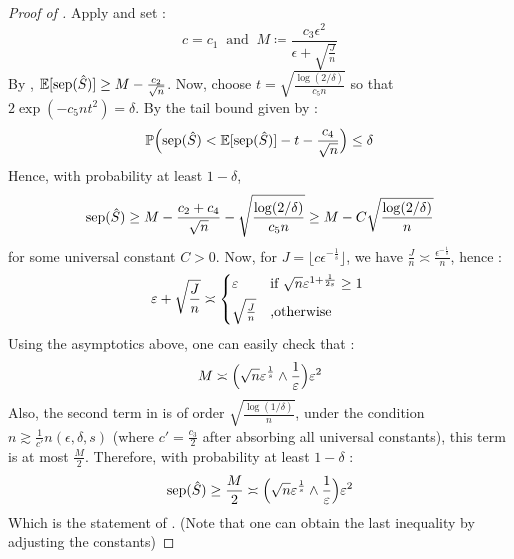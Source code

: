 \begin{proof}[Proof of ]
    Apply  and set : 
    \begin{equation*}
        c = c_1 \ \text{ and } \ M \coloneqq \frac{c_3 \epsilon^2}{\epsilon+ \sqrt{\frac{J}{n}}}
    \end{equation*}
    By , $\E[\sep(\hat{S})] \geq M -\frac{c_2}{\sqrt{n}}$. Now, choose $t = \sqrt{\frac{\log(2/\delta)}{c_5 n}}$ so that $2\exp(-c_5nt^2) = \delta$. By the tail bound given by  : 
    \begin{equation*}
        \P \Bigl(\sep(\hat{S}) <  \E[\sep(\hat{S})]-t-\frac{c_4}{\sqrt{n}}\Bigr) \leq \delta
    \end{equation*}
    Hence, with probability at least $1-\delta$, 
    \begin{equation}\label{ineqsep}
        \sep(\hat{S}) \geq M -\frac{c_2+c_4}{\sqrt{n}}-\sqrt{\frac{\log(2/\delta)}{c_5 n}} \geq M -C\sqrt{\frac{\log(2/\delta)}{n}}
    \end{equation}
    for some universal constant $C>0$. Now, for $J = \lfloor c\epsilon^{-\frac{1}{s}}\rfloor$, we have $\frac{J}{n} \asymp \frac{\epsilon^{-\frac{1}{s}}}{n}$, hence : 
    \begin{equation*}
        \epsilon+ \sqrt{\frac{J}{n}} \asymp \begin{cases*}
            \epsilon &\text{if} $\sqrt{n} \epsilon^{1+\frac{1}{2s}} \geq 1$ \\ 
            \sqrt{\frac{J}{n}} & ,otherwise
        \end{cases*}
    \end{equation*}
    Using the asymptotics above, one can easily check that : 
    \begin{equation*}
        M \asymp \Bigl(\sqrt{n}\epsilon^{\frac{1}{s}}\wedge \frac{1}{\epsilon}\Bigr)\epsilon^2
    \end{equation*}
    Also, the second term in  is of order $\sqrt{\frac{\log(1/\delta)}{n}}$, under the condition $n \gtrsim \frac{1}{c'}n(\epsilon,\delta,s)$ (where $c' = \frac{c_3}{2}$ after absorbing all universal constants), 
    this term is at most $\frac{M}{2}$. Therefore, with probability at least $1-\delta$ : 
    \begin{equation*}
        \sep(\hat{S}) \geq \frac{M}{2} \asymp \Bigl(\sqrt{n}\epsilon^{\frac{1}{s}}\wedge \frac{1}{\epsilon}\Bigr)\epsilon^2
    \end{equation*}
    Which is the statement of . (Note that one can obtain the last inequality by adjusting the constants)
\end{proof}
